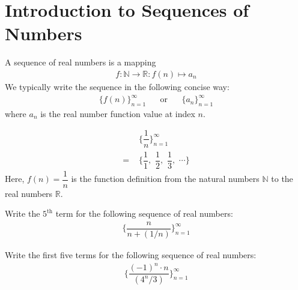 \section{Introduction to Sequences of Numbers}\label{introduction_to_sequences_of_numbers}

\begin{definition}
A sequence of real numbers is a mapping
\begin{align*}
    f: \mathbb{N} \longrightarrow \mathbb{R}: f(n) \mapsto a_{n}
\end{align*}
We typically write the sequence in the following concise way:
\begin{align*}
    \{f(n)\}_{n=1}^{\infty} \hspace{20pt} \text{or} \hspace{20pt} \{a_{n}\}_{n=1}^{\infty}
\end{align*}
where $a_{n}$ is the real number function value at index $n$.
\end{definition}

\begin{example}
\begin{align*}
    &\Big\{\dfrac{1}{n}\Big\}_{n=1}^{\infty}\\[2ex]
    = \hspace{4pt} &\Big\{\dfrac{1}{1}, \hspace{4pt} \dfrac{1}{2}, \hspace{4pt} \dfrac{1}{3}, \hspace{4pt} \cdots \Big\}
\end{align*}
Here, $f(n) = \dfrac{1}{n}$ is the function definition from the natural numbers $\mathbb{N}$ to the real numbers $\mathbb{R}$.
\end{example}

\begin{exercise}
Write the $5^{\text{th}}$ term for the following sequence of real numbers:
\begin{align*}
    \Big\{\dfrac{n}{n+(1/n)}\Big\}_{n=1}^{\infty}
\end{align*}
\end{exercise}

\begin{exercise}
Write the first five terms for the following sequence of real numbers:
\begin{align*}
    \Big\{\dfrac{(-1)^{n} \cdot n}{(4^{n}/3)}\Big\}_{n=1}^{\infty}
\end{align*}
\end{exercise}

